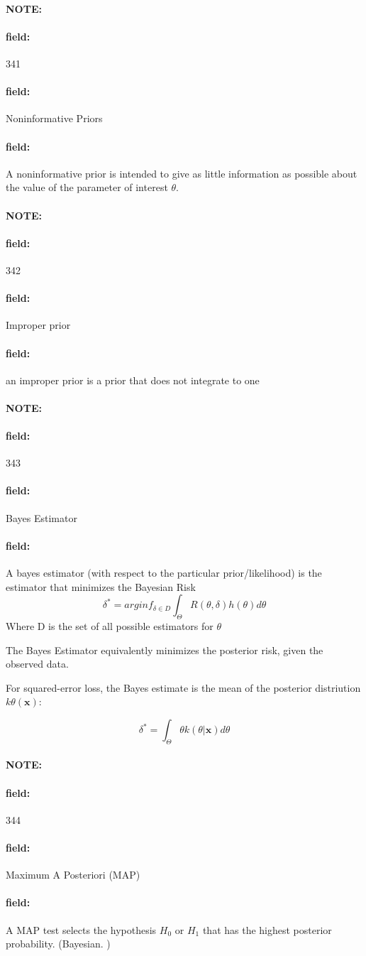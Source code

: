 \documentclass[12pt]{article}
\newenvironment{note}{\paragraph{NOTE:}}{}
\newenvironment{field}{\paragraph{field:}}{}
\begin{document}
\begin{note}
    \begin{field}
        \tiny 341
    \end{field}
    \begin{field}
        Noninformative Priors
    \end{field}
    \begin{field}
        A noninformative prior is intended to give as little information as possible about the value of the parameter of interest $\theta$.
    \end{field}
\end{note}


\begin{note}
    \begin{field}
        \tiny 342
    \end{field}
    \begin{field}
        Improper prior
    \end{field}
    \begin{field}
        an improper prior is a prior that does not integrate to one
    \end{field}
\end{note}


\begin{note}
    \begin{field}
        \tiny 343
    \end{field}
    \begin{field}
        Bayes Estimator
    \end{field}
    \begin{field}
        A bayes estimator (with respect to the particular prior/likelihood) is the estimator that minimizes the Bayesian Risk
        $$\delta^* = arg inf_{\delta \in D} \int_\Theta R(\theta,\delta)h(\theta)d\theta $$
        Where D is the set of all possible estimators for $\theta$

        The Bayes Estimator equivalently minimizes the posterior risk, given the observed data.

        For squared-error loss, the Bayes estimate is the mean of the posterior distriution $k\theta(\mathbf{x})$:

        $$\delta^* = \int_\Theta \theta k(\theta|\mathbf{x})d\theta $$
    \end{field}
\end{note}

\begin{note}
    \begin{field}
        \tiny 344
    \end{field}
    \begin{field}
        Maximum A Posteriori (MAP)
    \end{field}
    \begin{field}
        A MAP test selects the hypothesis $H_0$ or $H_1$ that has the highest posterior probability. (Bayesian. )
    \end{field}
\end{note}
\end{document}
